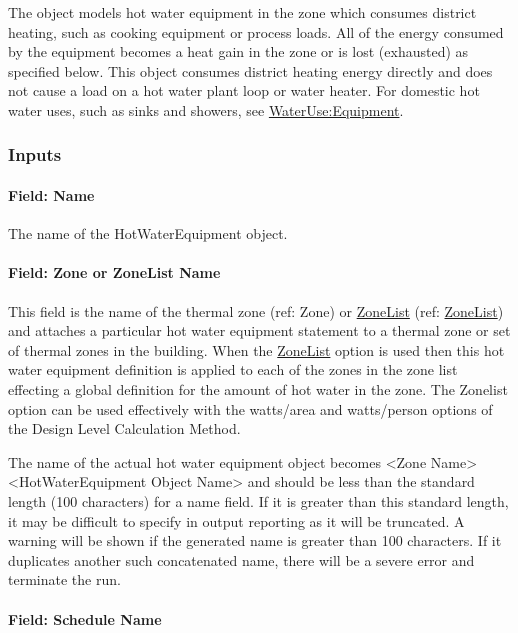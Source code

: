 The object models hot water equipment in the zone which consumes district heating, such as cooking equipment or process loads. All of the energy consumed by the equipment becomes a heat gain in the zone or is lost (exhausted) as specified below. This object consumes district heating energy directly and does not cause a load on a hot water plant loop or water heater. For domestic hot water uses, such as sinks and showers, see \hyperref[wateruseequipment]{WaterUse:Equipment}.

\subsubsection{Inputs}\label{inputs-5-015}

\paragraph{Field: Name}\label{field-name-5-011}

The name of the HotWaterEquipment object.

\paragraph{Field: Zone or ZoneList Name}\label{field-zone-or-zonelist-name-4}

This field is the name of the thermal zone (ref: Zone) or \hyperref[zonelist]{ZoneList} (ref: \hyperref[zonelist]{ZoneList}) and attaches a particular hot water equipment statement to a thermal zone or set of thermal zones in the building. When the \hyperref[zonelist]{ZoneList} option is used then this hot water equipment definition is applied to each of the zones in the zone list effecting a global definition for the amount of hot water in the zone. The Zonelist option can be used effectively with the watts/area and watts/person options of the Design Level Calculation Method.

The name of the actual hot water equipment object becomes \textless{}Zone Name\textgreater{} \textless{}HotWaterEquipment Object Name\textgreater{} and should be less than the standard length (100 characters) for a name field. If it is greater than this standard length, it may be difficult to specify in output reporting as it will be truncated. A warning will be shown if the generated name is greater than 100 characters. If it duplicates another such concatenated name, there will be a severe error and terminate the run.

\paragraph{Field: Schedule Name}\label{field-schedule-name-3-000}

